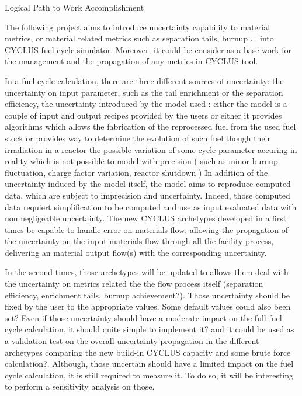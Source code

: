 \documentclass[dvips,12pt]{article}
\begin{document}
Logical Path to Work Accomplishment

The following project aims to introduce uncertainty capability to material metrics, or material related metrics such as separation tails, burnup ...  into CYCLUS fuel cycle simulator. Moreover, it could be consider as a base work for the management and the propagation of any metrics in CYCLUS tool.

In a fuel cycle calculation, there are three different sources of uncertainty:
the uncertainty on input parameter, such as the tail enrichment or the separation efficiency,
the uncertainty introduced by the model used :  either the model is a couple of input and output recipes provided by the users or either it provides algorithms which allows the fabrication of the reprocessed fuel from the used fuel stock or provides way to determine the evolution of such fuel though their irradiation in a reactor
the possible variation of some cycle parameter accuring in reality which is not possible to model with precision ( such as minor burnup fluctuation, charge factor variation, reactor shutdown )
In addition of the uncertainty induced by the model itself, the model aims to reproduce computed data, which are subject to imprecision and uncertainty. Indeed, those computed data requiert simplification to be computed and use as input evaluated data with non negligeable uncertainty.
The new CYCLUS archetypes developed in a first times be capable to handle error on materials flow, allowing the propagation of the uncertainty on the input materials flow through all the facility process, delivering an material output flow(s) with the corresponding uncertainty.

In the second times, those archetypes will be updated to allows them deal with the uncertainty on metrics related the the flow process itself (separation efficiency, enrichment tails, burnup achievement?). Those uncertainty should be fixed by the user to the appropriate values. Some default values could also been set?
Even if those uncertainty should have a moderate impact on the full fuel cycle calculation, it should quite simple to implement it? and it could be used as a validation test on the overall uncertainty propagation in the different archetypes comparing the new build-in CYCLUS capacity and some brute force calculation?.
Although, those uncertain should have a limited impact on the fuel cycle calculation, it is still required to measure it. To do so, it will be interesting to perform a sensitivity analysis on those.
\end{document}
